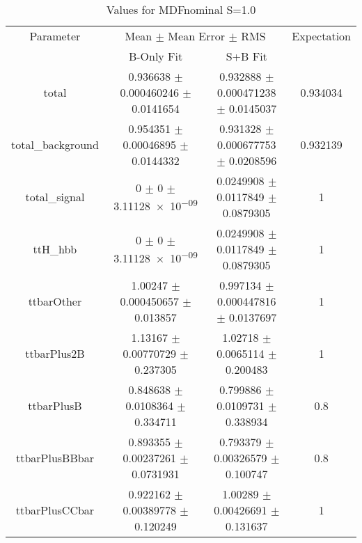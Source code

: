 \begin{table}
\centering
\caption{Values for MDFnominal S=1.0}
\begin{tabular}{cccc}
\toprule
Parameter & \multicolumn{2}{c}{Mean $\pm$ Mean Error $\pm$ RMS} & Expectation\\
 & B-Only Fit & S+B Fit & \\
\midrule
total & \num{0.936638} $\pm$ \num{0.000460246} $\pm$ \num{0.0141654} & \num{0.932888} $\pm$ \num{0.000471238} $\pm$ \num{0.0145037} & \num{0.934034}\\
total\_background & \num{0.954351} $\pm$ \num{0.00046895} $\pm$ \num{0.0144332} & \num{0.931328} $\pm$ \num{0.000677753} $\pm$ \num{0.0208596} & \num{0.932139}\\
total\_signal & \num{0} $\pm$ \num{0} $\pm$ \num{3.11128e-09} & \num{0.0249908} $\pm$ \num{0.0117849} $\pm$ \num{0.0879305} & \num{1}\\
ttH\_hbb & \num{0} $\pm$ \num{0} $\pm$ \num{3.11128e-09} & \num{0.0249908} $\pm$ \num{0.0117849} $\pm$ \num{0.0879305} & \num{1}\\
ttbarOther & \num{1.00247} $\pm$ \num{0.000450657} $\pm$ \num{0.013857} & \num{0.997134} $\pm$ \num{0.000447816} $\pm$ \num{0.0137697} & \num{1}\\
ttbarPlus2B & \num{1.13167} $\pm$ \num{0.00770729} $\pm$ \num{0.237305} & \num{1.02718} $\pm$ \num{0.0065114} $\pm$ \num{0.200483} & \num{1}\\
ttbarPlusB & \num{0.848638} $\pm$ \num{0.0108364} $\pm$ \num{0.334711} & \num{0.799886} $\pm$ \num{0.0109731} $\pm$ \num{0.338934} & \num{0.8}\\
ttbarPlusBBbar & \num{0.893355} $\pm$ \num{0.00237261} $\pm$ \num{0.0731931} & \num{0.793379} $\pm$ \num{0.00326579} $\pm$ \num{0.100747} & \num{0.8}\\
ttbarPlusCCbar & \num{0.922162} $\pm$ \num{0.00389778} $\pm$ \num{0.120249} & \num{1.00289} $\pm$ \num{0.00426691} $\pm$ \num{0.131637} & \num{1}\\
\bottomrule
\end{tabular}
\end{table}